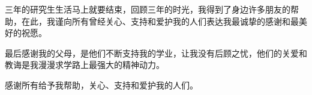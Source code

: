 \acknowledgment

三年的研究生生活马上就要结束，回顾三年的时光，我得到了身边许多朋友的帮助，在此，我谨向所有曾经关心、支持和爱护我的人们表达我最诚挚的感谢和最美好的祝愿。

最后感谢我的父母，是他们不断支持我的学业，让我没有后顾之忧，他们的关爱和教诲是我漫漫求学路上最强大的精神动力。 

感谢所有给予我帮助，关心、支持和爱护我的人们。
